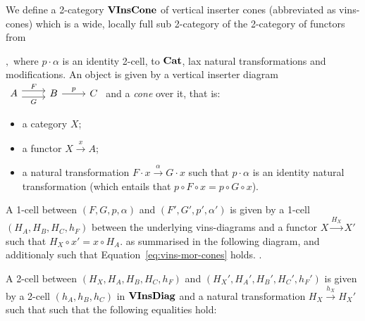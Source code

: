 \begin{definition}
  We define a 2-category $\mathbf{VInsCone}$ of vertical inserter cones (abbreviated as
  vins-cones) which is a wide, locally full sub 2-category 
  of the 2-category of functors from 
  
  $
,
  $
  where $p ⋅ α$ is an identity 2-cell, 
  to $\mathbf{Cat}$, lax natural transformations and modifications.
   An object is given by a vertical inserter diagram 
   $
   \begin{tikzcd}
   A \doublerightarrow{r}{F}{G} & B \ar[r,"p"] & C
   \end{tikzcd}
   $
   and a \emph{cone} over it, that is:
   \begin{itemize}
    \item a category $X$;
    \item a functor $X \xrightarrow{x}A$;
    \item a natural transformation  $ F · x \xrightarrow{α} G · x$ such that 
     $p ⋅ α$ is an identity natural transformation
     (which entails that $p∘ F∘ x = p ∘ G ∘ x$).
   \end{itemize}
   A 1-cell between $(F,G,p,α)$ and $(F',G',p',α')$ is given 
   by a 1-cell $(H_A,H_B,H_C,h_F)$ between 
   the underlying vins-diagrams and a functor 
   $X\xrightarrow{H_X} X'$ such that 
   $H_X ∘ x' = x ∘ H_A$.
   as summarised in the following diagram, and additionaly such that 
   Equation~\eqref{eq:vins-mor-cones} holds.
   .
   \[

\]
\begin{equation}
  \label{eq:vins-mor-cones}

\end{equation}


A 2-cell between $(H_X,H_A, H_B, H_C, h_F)$ and
$(H_X',H_A', H_B', H_C', h_F')$ is given
by a 2-cell $(h_A,h_B,h_C)$ in $\mathbf{VInsDiag}$ and a natural transformation
$H_X \xrightarrow{h_X} H_X'$ such that
 such that the following equalities hold:
\[

\]
\end{definition}
\cite{bird1989flexible}
